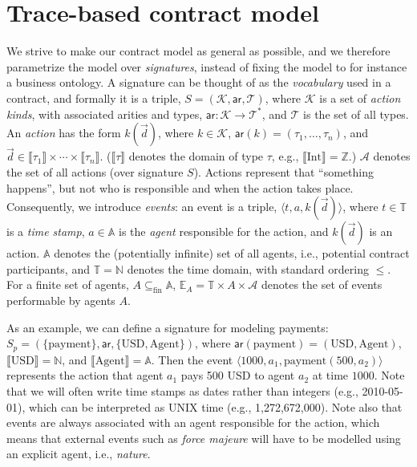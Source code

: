 \documentclass[orivec,final]{llncs-href}
\newcommand{\nat}{\mathbb{N}}
\newcommand{\actionkindset}{\mathcal{K}}
\newcommand{\typeset}{\mathcal{T}}
\newcommand{\actionset}{\mathcal{A}}
\newcommand{\timeset}{\mathbb{T}}
\newcommand{\agentset}{\mathbb{A}}
\newcommand{\eventset}[1]{\mathbb{E}_{#1}}
\newcommand{\tp}{\mathsf{ar}}
\newcommand{\dendom}[1]{\llbracket #1 \rrbracket}
\newcommand{\type}{\tau}
\newcommand{\finsubset}{\subseteq_{\mathrm{fin}}}
\newcommand{\event}[3]{\langle #1,#2,#3\rangle}
\begin{document}
\section{Trace-based contract model}\label{sec:tracemodel}
We strive to make our contract model as general as possible, and we
therefore parametrize the model over \emph{signatures}, instead of
fixing the model to for instance a business ontology. A signature can
be thought of as the \emph{vocabulary} used in a contract, and
formally it is a triple, $S =
(\actionkindset,\tp,\typeset)$, where $\actionkindset$ is a set of
\emph{action kinds}, with associated arities and types, $\tp :
\actionkindset \to \typeset^*$, and $\typeset$ is the set of all
types. An \emph{action} has the form $k(\vec{d})$, where $k \in
\actionkindset$, $\tp(k) = (\type_1,\ldots,\type_n)$, and $\vec{d} 
\in \dendom{\type_1} \times \cdots \times
\dendom{\type_n}$. ($\dendom{\type}$ denotes the domain of  type
$\type$, e.g., $\dendom{\mathrm{Int}} = \mathbb{Z}$.) $\actionset$
denotes the set of all actions (over signature $S$). Actions represent
that ``something happens'', but not who is responsible and when the
action takes place. Consequently, we introduce \emph{events}: an event
is a triple, $\event{t}{a}{k(\vec{d})}$, where $t \in \timeset$ is a
\emph{time stamp}, $a \in \agentset$ is the \emph{agent} responsible
for the action, and $k(\vec{d})$ is an action. $\agentset$ denotes the
(potentially infinite) set of all agents, i.e., potential contract
participants, and $\timeset = \nat$ denotes the time domain, with
standard ordering $\leq$. For a finite set of agents, $A \finsubset
\agentset$, $\eventset{A} = \timeset \times A \times \actionset$
denotes the set of events performable  by agents $A$.

As an example, we can define a signature for modeling payments: $S_p
= (\{\mathrm{payment}\}, \tp, \{\mathrm{USD},\mathrm{Agent}\})$, where
$\tp(\mathrm{payment}) = (\mathrm{USD},\mathrm{Agent})$,
$\dendom{\mathrm{USD}} = \mathbb{N}$, and $\dendom{\mathrm{Agent}} =
\agentset$. Then the event
$\event{1000}{a_1}{\mathrm{payment}(500,a_2)}$ represents the action
that agent $a_1$ pays 500 USD to agent $a_2$ at time $1000$. Note that
we will often write time stamps as dates rather than integers (e.g.,
2010-05-01), which can be interpreted as UNIX time (e.g.,
1,272,672,000). Note also that events are always associated with an
agent responsible for the action, which means that external events
such as  \emph{force majeure} will have to be modelled using an
explicit agent, i.e., \emph{nature}.
\end{document}

